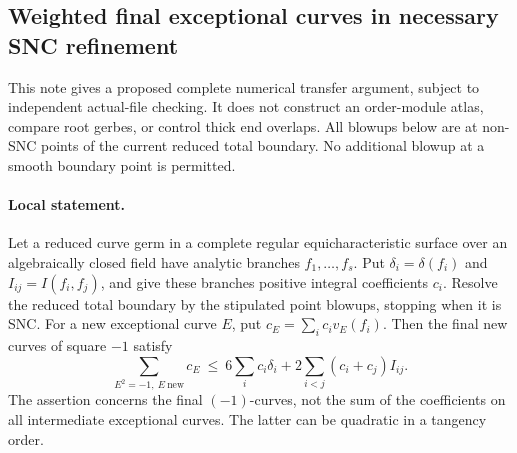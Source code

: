 \subsection*{Weighted final exceptional curves in necessary SNC refinement}

This note gives a proposed complete numerical transfer argument, subject to
independent actual-file checking.  It does not construct an order-module
atlas, compare root gerbes, or control thick end overlaps.  All blowups
below are at non-SNC points of the current reduced total boundary.  No
additional blowup at a smooth boundary point is permitted.

\paragraph{Local statement.}
Let a reduced curve germ in a complete regular equicharacteristic surface
over an algebraically closed field have analytic branches $f_1,\ldots,f_s$.
Put $\delta_i=\delta(f_i)$ and $I_{ij}=I(f_i,f_j)$, and give these
branches positive integral coefficients $c_i$.  Resolve the reduced total
boundary by the stipulated point blowups, stopping when it is SNC.
For a new exceptional curve $E$, put
$c_E=\sum_i c_i v_E(f_i)$.  Then the final new curves of square $-1$
satisfy
\[
 \sum_{E^2=-1,\ E\ \mathrm{new}}c_E
 \ \le\ 6\sum_i c_i\delta_i
       +2\sum_{i<j}(c_i+c_j)I_{ij}.                 \tag{D.WS.1}
\]
The assertion concerns the final $(-1)$-curves, not the sum of the
coefficients on all intermediate exceptional curves.  The latter can
be quadratic in a tangency order.

